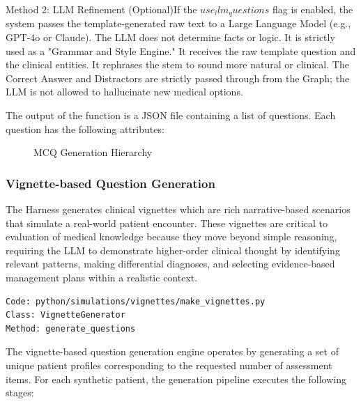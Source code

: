Method 2: LLM Refinement (Optional)If the $use_llm_questions$ flag is enabled, the system passes the template-generated raw text to a Large Language Model (e.g., GPT-4o or Claude). The LLM does not determine facts or logic. It is strictly used as a "Grammar and Style Engine." It receives the raw template question and the clinical entities. It rephrases the stem to sound more natural or clinical. The Correct Answer and Distractors are strictly passed through from the Graph; the LLM is not allowed to hallucinate new medical options.

The output of the function is a JSON file containing a list of questions. Each question has the following attributes:
\begin{figure}[H]
\caption{MCQ Generation Hierarchy}
\label{fig:mcq_json_structure}
\end{figure}


\subsubsection{Vignette-based Question Generation}
The Harness generates clinical vignettes which are rich narrative-based scenarios that simulate a real-world patient encounter. These vignettes are critical to evaluation of medical knowledge  because they move beyond simple reasoning, requiring the LLM to demonstrate higher-order clinical thought by identifying relevant patterns, making differential diagnoses, and selecting evidence-based management plans within a realistic context.

\begin{verbatim}
Code: python/simulations/vignettes/make_vignettes.py
Class: VignetteGenerator
Method: generate_questions
\end{verbatim}

The vignette-based question generation engine operates by generating a set of unique patient profiles corresponding to the requested number of assessment items. For each synthetic patient, the generation pipeline executes the following stages:

